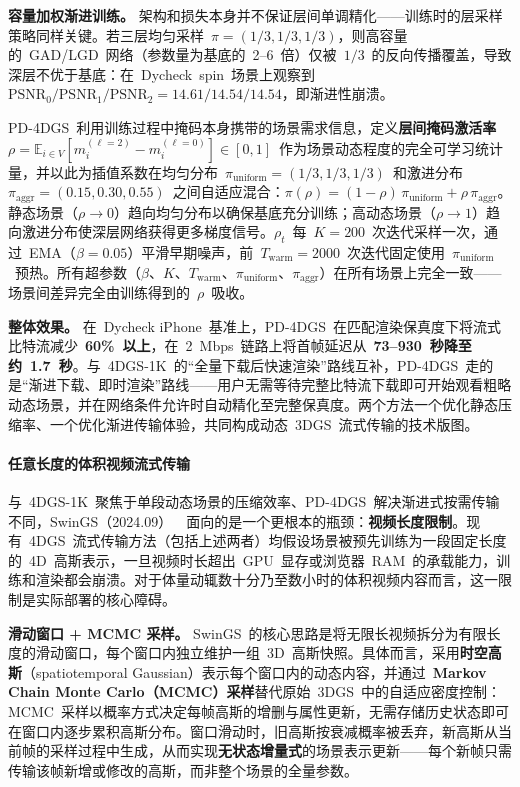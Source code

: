 \smallskip\noindent\textbf{容量加权渐进训练。}
架构和损失本身并不保证层间单调精化——训练时的层采样策略同样关键。若三层均匀采样~$\pi = (1/3, 1/3, 1/3)$，则高容量的~GAD/LGD~网络（参数量为基底的~2--6~倍）仅被~$1/3$~的反向传播覆盖，导致深层不优于基底：在~Dycheck~spin~场景上观察到~$\text{PSNR}_0 / \text{PSNR}_1 / \text{PSNR}_2 = 14.61/14.54/14.54$，即渐进性崩溃。

PD-4DGS~利用训练过程中掩码本身携带的场景需求信息，定义\textbf{层间掩码激活率}~$\rho = \mathbb{E}_{i \in V}[m_i^{(\ell=2)} - m_i^{(\ell=0)}] \in [0,1]$~作为场景动态程度的完全可学习统计量，并以此为插值系数在均匀分布~$\pi_{\mathrm{uniform}} = (1/3, 1/3, 1/3)$~和激进分布~$\pi_{\mathrm{aggr}} = (0.15, 0.30, 0.55)$~之间自适应混合：$\pi(\rho) = (1-\rho)\,\pi_{\mathrm{uniform}} + \rho\,\pi_{\mathrm{aggr}}$。静态场景（$\rho \to 0$）趋向均匀分布以确保基底充分训练；高动态场景（$\rho \to 1$）趋向激进分布使深层网络获得更多梯度信号。$\rho_t$~每~$K=200$~次迭代采样一次，通过~EMA（$\beta=0.05$）平滑早期噪声，前~$T_{\mathrm{warm}}=2000$~次迭代固定使用~$\pi_{\mathrm{uniform}}$~预热。所有超参数（$\beta$、$K$、$T_{\mathrm{warm}}$、$\pi_{\mathrm{uniform}}$、$\pi_{\mathrm{aggr}}$）在所有场景上完全一致——场景间差异完全由训练得到的~$\rho$~吸收。

\smallskip\noindent\textbf{整体效果。}
在~Dycheck iPhone~基准上，PD-4DGS~在匹配渲染保真度下将流式比特流减少~\textbf{60\%~以上}，在~2~Mbps~链路上将首帧延迟从~\textbf{73--930~秒降至约~1.7~秒}。与~4DGS-1K~的``全量下载后快速渲染''路线互补，PD-4DGS~走的是``渐进下载、即时渲染''路线——用户无需等待完整比特流下载即可开始观看粗略动态场景，并在网络条件允许时自动精化至完整保真度。两个方法一个优化静态压缩率、一个优化渐进传输体验，共同构成动态~3DGS~流式传输的技术版图。

\paragraph{任意长度的体积视频流式传输}

与~4DGS-1K~聚焦于单段动态场景的压缩效率、PD-4DGS~解决渐进式按需传输不同，SwinGS（2024.09）~\cite{2409_07759}~面向的是一个更根本的瓶颈：\textbf{视频长度限制}。现有~4DGS~流式传输方法（包括上述两者）均假设场景被预先训练为一段固定长度的~4D~高斯表示，一旦视频时长超出~GPU~显存或浏览器~RAM~的承载能力，训练和渲染都会崩溃。对于体量动辄数十分乃至数小时的体积视频内容而言，这一限制是实际部署的核心障碍。

\smallskip\noindent\textbf{滑动窗口 + MCMC 采样。}
SwinGS~的核心思路是将无限长视频拆分为有限长度的滑动窗口，每个窗口内独立维护一组~3D~高斯快照。具体而言，采用\textbf{时空高斯}（spatiotemporal Gaussian）表示每个窗口内的动态内容，并通过~\textbf{Markov Chain Monte Carlo（MCMC）采样}替代原始~3DGS~中的自适应密度控制：MCMC~采样以概率方式决定每帧高斯的增删与属性更新，无需存储历史状态即可在窗口内逐步累积高斯分布。窗口滑动时，旧高斯按衰减概率被丢弃，新高斯从当前帧的采样过程中生成，从而实现\textbf{无状态增量式}的场景表示更新——每个新帧只需传输该帧新增或修改的高斯，而非整个场景的全量参数。

